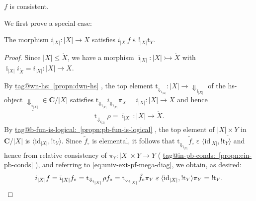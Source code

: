 \documentclass{amsart}
\makeatletter
\newcommand\abs[2][]{#1\lvert{#2}#1\rvert}
\newcommand\bC{\mathbf{C}}
\newcommand\br[1]{\langle{}#1\rangle{}}
\newcommand\Dwn{{\Downarrow}}
\newcommand\ein{\mathrel{\varepsilon}}
\newcommand\ibar{\bar{\imath}}
\newcommand\id{\mathrm{id}}
\newcommand\oring[1]{\mathring{#1}}
\newcommand\rt{\mathrm{t}}
\newcommand\tto{\rightarrowtail}
\newcommand\und[1]{\underline{#1}}
\newcommand\unex{{!}}
\newcommand\tagword[1]{\csname tag@#1\endcsname}
\def\label@tag#1:#2\@nil{#1}
\newcommand\labeltag[1]{\label@tag#1:\@nil}
\newcommand\jref[1]{%
  \texorpdfstring%
    {\hyperref[#1]{\tagword{\labeltag{#1}}~\ref*{#1}}}%
    {\tagword{\labeltag{#1}}~\ref*{#1}}%
}
\theoremstyle{definition}
\theoremstyle{remark}
\theoremstyle{plainwithref}
\makeatother
\begin{document}
\begin{claim} \label{claim:f-consis}
  \( f \) is consistent.
\end{claim}

We first prove a special case:
\begin{claim} \label{claim:f-consis-global-top}
  The morphism \( i_{\abs X} \colon \abs{X} \to X \) satisfies \( i_{\abs X} f \ein \unex_{\abs X} \rt_Y \).
\end{claim}

\begin{proof}
  Since \( \abs X \le \oring X \), we have a morphism \( \ibar_{\abs X} \colon \abs X \tto \oring X \) with \( \ibar_{\abs X} i_{\oring X} = i_{\abs X} \colon \abs X \to X \).

  By \jref{propn:dwn-hs}, the top element \( \rt_{\Dwn_{i_{\abs X}}} \colon \abs X \to \Dwn_{i_{\abs X}} \) of the hs-object \( \und{\Dwn_{i_{\abs X}}} \in \bC / \abs X \) satisfies \( \rt_{\Dwn_{i_{\abs X}}} i_{\Dwn_{i_{\abs X}}} \pi_X = i_{\abs X} \colon \abs X \to X \) and hence
  \[
    \rt_{\Dwn_{i_{\abs X}}}\ \rho = \ibar_{\abs X} \colon \abs X \to \oring X.
  \]
  By \jref{propn:pb-fun-is-logical}, the top element of \( \und{\abs{X} \times Y} \) in \( \bC/ \abs X  \) is \( \br{\id_{\abs X}, \unex \rt_Y} \).
  Since \( \tilde f_\circ \) is elemental, it follows that \( \rt_{\Dwn_{i_{\abs X}}} \tilde f_\circ \ein \br{\id_{\abs X}, \unex \rt_Y} \) and hence from
  relative consistency of \( \pi_Y \colon \abs{X} \times Y \to Y \) (\jref{propn:ein-pb-conds}), and referring to \eqref{eq:univ-ext-pf-mega-diag}, we obtain, as desired:
  \[
    i_{\abs X} f =
    \ibar_{\abs X} f_\circ =
    \rt_{\Dwn_{i_{\abs X}}} \rho f_\circ =
    \rt_{\Dwn_{i_{\abs X}}} \tilde f_\circ \pi_Y \ein
    \br{\id_{\abs X}, \unex \rt_Y} \pi_Y =
    \unex \rt_Y.
    \qedhere
  \]
\end{proof}
\end{document}
